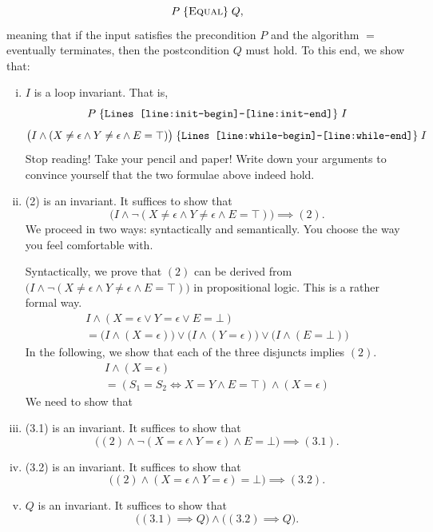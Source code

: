 \documentclass{tufte-handout}
\begin{document}
\begin{CJK*}{UTF8}{gbsn}

\[
  P \;\{\textsc{Equal}\}\; Q,
\]
meaning that if the input satisfies the precondition $P$
and the algorithm $\equal$ eventually terminates,
then the postcondition $Q$ must hold.
To this end, we show that:



\begin{enumerate}[(i)]
  \item $I$ is a loop invariant. That is,
    \[
      P \;\{\texttt{Lines~\ref{line:init-begin}--\ref{line:init-end}}\}\; I
    \]
    \[
      \big(I \land (X \neq \epsilon \land Y \neq \epsilon \land E = \top)\big) \;\{\texttt{Lines~\ref{line:while-begin}--\ref{line:while-end}}\}\; I
    \]
    Stop reading! Take your pencil and paper! 
    Write down your arguments to convince yourself that the two formulae above indeed hold.
  \item (2) is an invariant. It suffices to show that
    \[
      \big(I \land \lnot (X \neq \epsilon \land Y \neq \epsilon \land E = \top)\big) \implies (2).
    \]
    We proceed in two ways: syntactically and semantically. You choose the way you feel comfortable with.

    Syntactically, we prove that $(2)$ can be derived from $\big(I \land \lnot (X \neq \epsilon \land Y \neq \epsilon \land E = \top)\big)$
    in propositional logic. 
    This is a rather formal way.
    \begin{gather}
      I \land (X = \epsilon \lor Y = \epsilon \lor E = \bot) \\ \nonumber
      = \big(I \land (X = \epsilon)\big) \lor \big(I \land (Y = \epsilon)\big) \lor \big(I \land (E = \bot)\big)
    \end{gather}
    In the following, we show that each of the three disjuncts implies $(2)$.
    \begin{gather}
      I \land (X = \epsilon) \\ \nonumber
      = (S_1 = S_2 \iff X = Y \land E = \top) \land (X = \epsilon)
    \end{gather}
    We need to show that  
  \item (3.1) is an invariant. It suffices to show that
    \[
      \big((2) \land \lnot (X = \epsilon \land Y = \epsilon) \land E = \bot\big) \implies (3.1).
    \]
  \item (3.2) is an invariant. It suffices to show that
    \[
      \big((2) \land (X = \epsilon \land Y = \epsilon) = \bot\big) \implies (3.2).
    \]
  \item $Q$ is an invariant. It suffices to show that
    \[
      \big((3.1) \implies Q\big) \land \big((3.2) \implies Q\big).
    \]
\end{enumerate}


\end{CJK*}
\end{document}
